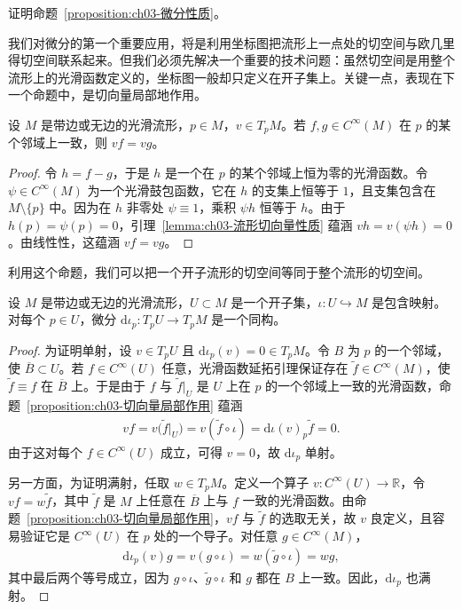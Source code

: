 \documentclass[../../main.tex]{subfiles}
\begin{document}
\begin{exercise}\label{exercise:ch03-3.7}
证明命题~\cref{proposition:ch03-微分性质}。
\end{exercise}

我们对微分的第一个重要应用，将是利用坐标图把流形上一点处的切空间与欧几里得切空间联系起来。但我们必须先解决一个重要的技术问题：虽然切空间是用整个流形上的光滑函数定义的，坐标图一般却只定义在开子集上。关键一点，表现在下一个命题中，是切向量局部地作用。

\begin{proposition}\label{proposition:ch03-切向量局部作用}
设 $M$ 是带边或无边的光滑流形，$p\in M$，$v\in T_{p}M$。若 $f,g\in C^{\infty}(M)$ 在 $p$ 的某个邻域上一致，则 $vf=vg$。
\end{proposition}

\begin{proof}
令 $h=f-g$，于是 $h$ 是一个在 $p$ 的某个邻域上恒为零的光滑函数。令 $\psi\in C^{\infty}(M)$ 为一个光滑鼓包函数，它在 $h$ 的支集上恒等于 $1$，且支集包含在 $M\setminus\{p\}$ 中。因为在 $h$ 非零处 $\psi\equiv 1$，乘积 $\psi h$ 恒等于 $h$。由于 $h(p)=\psi(p)=0$，引理~\cref{lemma:ch03-流形切向量性质} 蕴涵 $vh=v(\psi h)=0$。由线性性，这蕴涵 $vf=vg$。
\end{proof}

利用这个命题，我们可以把一个开子流形的切空间等同于整个流形的切空间。

\begin{proposition}[开子流形的切空间]\label{proposition:ch03-开子流形切空间}
设 $M$ 是带边或无边的光滑流形，$U\subset M$ 是一个开子集，$\iota:U\hookrightarrow M$ 是包含映射。对每个 $p\in U$，微分 $\mathrm{d}\iota_{p}:T_{p}U\to T_{p}M$ 是一个同构。
\end{proposition}

\begin{proof}
为证明单射，设 $v\in T_{p}U$ 且 $\mathrm{d}\iota_{p}(v)=0\in T_{p}M$。令 $B$ 为 $p$ 的一个邻域，使 $\overline{B}\subset U$。若 $f\in C^{\infty}(U)$ 任意，光滑函数延拓引理保证存在 $\widetilde{f}\in C^{\infty}(M)$，使 $\widetilde{f}\equiv f$ 在 $\overline{B}$ 上。于是由于 $f$ 与 $\widetilde{f}|_{U}$ 是 $U$ 上在 $p$ 的一个邻域上一致的光滑函数，命题~\cref{proposition:ch03-切向量局部作用} 蕴涵
\begin{align*}
vf=v\bigl(\widetilde{f}|_{U}\bigr)=v(\widetilde{f}\circ\iota)=\mathrm{d}\iota(v)_{p}\widetilde{f}=0.
\end{align*}
由于这对每个 $f\in C^{\infty}(U)$ 成立，可得 $v=0$，故 $\mathrm{d}\iota_{p}$ 单射。

另一方面，为证明满射，任取 $w\in T_{p}M$。定义一个算子 $v:C^{\infty}(U)\to\mathbb{R}$，令 $vf=w\widetilde{f}$，其中 $\widetilde{f}$ 是 $M$ 上任意在 $\overline{B}$ 上与 $f$ 一致的光滑函数。由命题~\cref{proposition:ch03-切向量局部作用}，$vf$ 与 $\widetilde{f}$ 的选取无关，故 $v$ 良定义，且容易验证它是 $C^{\infty}(U)$ 在 $p$ 处的一个导子。对任意 $g\in C^{\infty}(M)$，
\begin{align*}
\mathrm{d}\iota_{p}(v)g=v(g\circ\iota)=w(\widetilde{g}\circ\iota)=wg,
\end{align*}
其中最后两个等号成立，因为 $g\circ\iota$、$\widetilde{g}\circ\iota$ 和 $g$ 都在 $B$ 上一致。因此，$\mathrm{d}\iota_{p}$ 也满射。
\end{proof}
\end{document}
